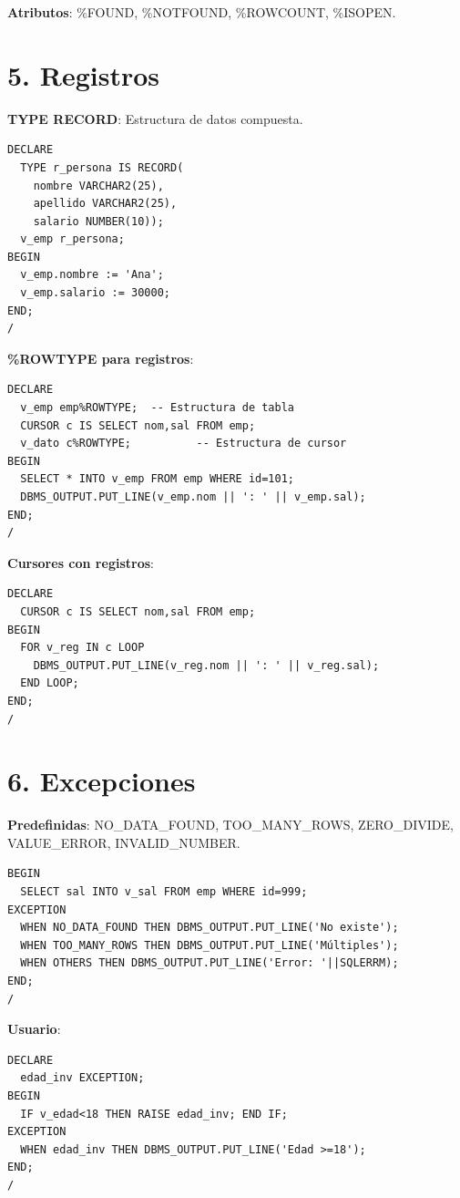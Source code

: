 \documentclass[8pt,a4paper,twocolumn]{article}
\begin{document}
\textbf{Atributos}: \%FOUND, \%NOTFOUND, \%ROWCOUNT, \%ISOPEN.

\section*{5. Registros}

\textbf{TYPE RECORD}: Estructura de datos compuesta.

\begin{lstlisting}
DECLARE
  TYPE r_persona IS RECORD(
    nombre VARCHAR2(25),
    apellido VARCHAR2(25),
    salario NUMBER(10));
  v_emp r_persona;
BEGIN
  v_emp.nombre := 'Ana';
  v_emp.salario := 30000;
END;
/
\end{lstlisting}

\textbf{\%ROWTYPE para registros}:
\begin{lstlisting}
DECLARE
  v_emp emp%ROWTYPE;  -- Estructura de tabla
  CURSOR c IS SELECT nom,sal FROM emp;
  v_dato c%ROWTYPE;          -- Estructura de cursor
BEGIN
  SELECT * INTO v_emp FROM emp WHERE id=101;
  DBMS_OUTPUT.PUT_LINE(v_emp.nom || ': ' || v_emp.sal);
END;
/
\end{lstlisting}

\textbf{Cursores con registros}:
\begin{lstlisting}
DECLARE
  CURSOR c IS SELECT nom,sal FROM emp;
BEGIN
  FOR v_reg IN c LOOP
    DBMS_OUTPUT.PUT_LINE(v_reg.nom || ': ' || v_reg.sal);
  END LOOP;
END;
/
\end{lstlisting}

\section*{6. Excepciones}

\textbf{Predefinidas}: NO\_DATA\_FOUND, TOO\_MANY\_ROWS, ZERO\_DIVIDE, VALUE\_ERROR, INVALID\_NUMBER.

\begin{lstlisting}
BEGIN
  SELECT sal INTO v_sal FROM emp WHERE id=999;
EXCEPTION
  WHEN NO_DATA_FOUND THEN DBMS_OUTPUT.PUT_LINE('No existe');
  WHEN TOO_MANY_ROWS THEN DBMS_OUTPUT.PUT_LINE('Múltiples');
  WHEN OTHERS THEN DBMS_OUTPUT.PUT_LINE('Error: '||SQLERRM);
END;
/
\end{lstlisting}

\textbf{Usuario}:
\begin{lstlisting}
DECLARE
  edad_inv EXCEPTION;
BEGIN
  IF v_edad<18 THEN RAISE edad_inv; END IF;
EXCEPTION
  WHEN edad_inv THEN DBMS_OUTPUT.PUT_LINE('Edad >=18');
END;
/
\end{lstlisting}
\end{document}
